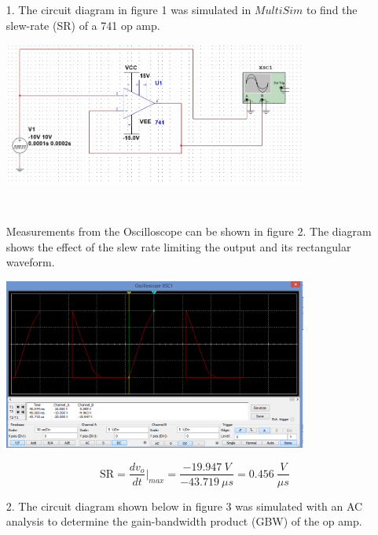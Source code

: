 \documentclass[11pt,a4paper]{article}
\begin{document}
\begin{enumerate}
  \item[1.]
  The circuit diagram in figure 1 was simulated in $MultiSim$ to find the slew-rate (SR) of a 741 op amp.\\
    \begin{minipage}{\linewidth}
      \centering       
       \includegraphics[width=10cm]{Task1-1Circuit}\\
    \end{minipage}\\
\pagebreak
\pagebreak

Measurements from the Oscilloscope can be shown in figure 2. The diagram shows the effect of the slew rate limiting the output and its rectangular waveform.\\
	
    \begin{minipage}{\linewidth}
      \centering       
       \includegraphics[width=10cm]{Task1-1-Oscilloscope}\\
    \end{minipage}
$$ \text{SR} = \dfrac{dv_{o}}{dt}|_{max} = \dfrac{-19.947 \ V}{-43.719\ \mu s} = 0.456\ \frac{V}{\mu s} $$
  \item[2.]
  The circuit diagram shown below in figure 3 was simulated with an AC analysis to determine the gain-bandwidth product (GBW) of the op amp.  
  

\end{enumerate}
\end{document}
